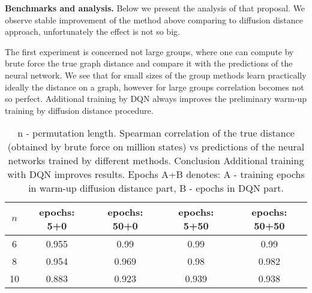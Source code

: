 \documentclass[atmp]{ipart_v1}
\numberwithin{equation}{section}
\theoremstyle{plain}%
\begin{document}
{\bf Benchmarks and analysis.}
Below we present the analysis of that proposal. 
We observe  stable improvement of the method above comparing to diffusion distance approach, unfortunately the effect is not so big.  

The first experiment is concerned not large groups, where one can compute by brute force the true graph distance and compare it with the predictions of the neural network. We see that for small sizes of the group methods learn practically ideally the distance on a graph, however for large groups correlation becomes not so perfect. Additional training by DQN always improves the preliminary warm-up training by diffusion distance procedure. 


\begin{table}[h]
    \centering
    \begin{tabular}{|c|c|c|c|c|}
        \hline
        $n$  & epochs: 5+0  & epochs: 50+0   & epochs: 5+50   & epochs: 50+50  \\
        \hline
        6 &  0.955 & 0.99  & 0.99  & 0.99 \\
        8 &  0.954 & 0.969 & 0.98   & 0.982 \\
        10 & 0.883  & 0.923 & 0.939   &  0.938 \\
        \hline
    \end{tabular}
    \captionsetup{skip=10pt} 
    \caption{n - permutation length. Spearman correlation of the true distance (obtained by brute force on million states) vs predictions of the neural networks trained by different methods. Conclusion Additional training with DQN improves results. Epochs A+B denotes: A - training epochs in warm-up diffusion distance part, B - epochs in DQN part.  }
    \label{tab:example}
\end{table}
\end{document}
